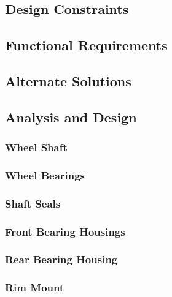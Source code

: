\subsection{Design Constraints}
\subsection{Functional Requirements}
\subsection{Alternate Solutions}
\subsection{Analysis and Design}
\subsubsection{Wheel Shaft}
\subsubsection{Wheel Bearings}
\subsubsection{Shaft Seals}
\subsubsection{Front Bearing Housings}
\subsubsection{Rear Bearing Housing}
\subsubsection{Rim Mount}